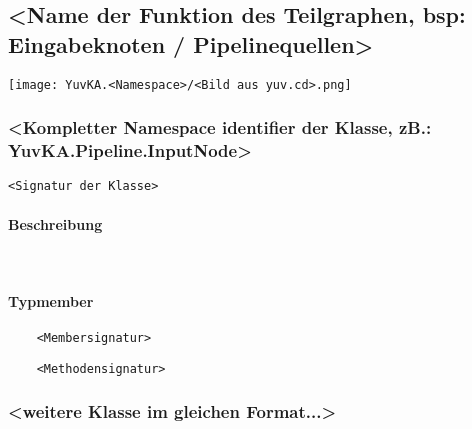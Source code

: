 \subsection{<Name der Funktion des Teilgraphen, bsp: Eingabeknoten / Pipelinequellen>}
	
\texttt{[image: YuvKA.<Namespace>/<Bild aus yuv.cd>.png]}

\subsubsection{<Kompletter Namespace identifier der Klasse, zB.: YuvKA.Pipeline.InputNode>}

\begin{verbatim}
<Signatur der Klasse>
\end{verbatim}

\paragraph{Beschreibung}~\\

\paragraph{Typmember}
\begin{itemize}

	\begin{verbatim}
	<Membersignatur>
	\end{verbatim}


	\begin{verbatim}
	<Methodensignatur>
	\end{verbatim}


\end{itemize}

\subsubsection{<weitere Klasse im gleichen Format...>}

